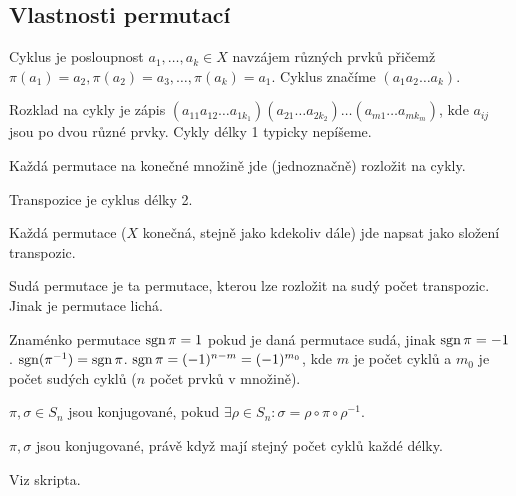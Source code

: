 \documentclass[12pt]{article}                   %
\begin{document}
    \subsection{Vlastnosti permutací}
        \begin{definice}[Cyklus]
            Cyklus je posloupnost $a_1, …, a_k \in X$ navzájem různých prvků přičemž $\pi(a_1) = a_2, \pi(a_2) = a_3, …, \pi(a_k) = a_1$. Cyklus značíme $(a_1 a_2 … a_k)$.
        \end{definice}

        \begin{definice}
            Rozklad na cykly je zápis $(a_{11} a_{12} … a_{1k_1})(a_{21} … a_{2k_2})…(a_{m1} … a_{mk_m})$, kde $a_{ij}$ jsou po dvou různé prvky. Cykly délky 1 typicky nepíšeme.

            Každá permutace na konečné množině jde (jednoznačně) rozložit na cykly.
        \end{definice}

        \begin{definice}[Transpozice]
            Transpozice je cyklus délky 2.

            Každá permutace ($X$ konečná, stejně jako kdekoliv dále) jde napsat jako složení transpozic.
        \end{definice}

        \begin{definice}
            Sudá permutace je ta permutace, kterou lze rozložit na sudý počet transpozic. Jinak je permutace lichá.

            Znaménko permutace $\operatorname{sgn} \pi = 1$ pokud je daná permutace sudá, jinak $\operatorname{sgn} \pi = -1$. $\operatorname{sgn}(\pi^{-1}) = \operatorname{sgn} \pi$. $\operatorname{sgn} \pi = (-1)^{n-m} = (-1)^{m_0}$, kde $m$ je počet cyklů a $m_0$ je počet sudých cyklů ($n$ počet prvků v množině).
        \end{definice}

        \begin{definice}[Konjugované]
            $\pi, \sigma \in S_n$ jsou konjugované, pokud $\exists \rho \in S_n: \sigma = \rho\circ\pi\circ\rho^{-1}$.
        \end{definice}

        \begin{tvrzeni}
            $\pi, \sigma$ jsou konjugované, právě když mají stejný počet cyklů každé délky.
            
            \begin{dukazin}
                Viz skripta.
            \end{dukazin}
        \end{tvrzeni}
        
\end{document}

